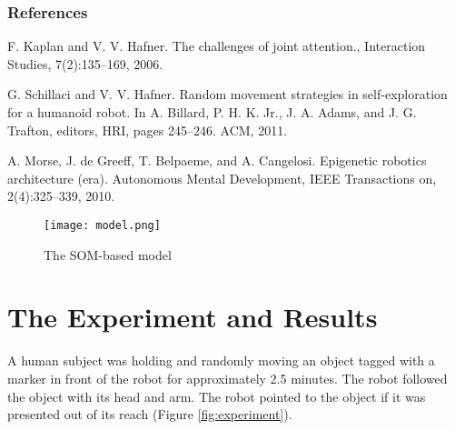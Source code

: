 \documentclass[final]{beamer}
\begin{document}
\begin{frame}[t]
\begin{multicols}{2}
\subsubsection{References}

% 
\begin{thebibliography}{99}

 F. Kaplan and V. V. Hafner. The challenges of joint attention., Interaction Studies, 7(2):135–169, 2006.


 G. Schillaci and V. V. Hafner. Random movement strategies in self-exploration for a humanoid robot. In A. Billard, P. H. K. Jr., J. A. Adams, and J. G. Trafton, editors, HRI, pages 245–246. ACM, 2011.

 A. Morse, J. de Greeff, T. Belpaeme, and A. Cangelosi. Epigenetic robotics architecture (era).
Autonomous Mental Development, IEEE Transactions on, 2(4):325–339, 2010.

\end{thebibliography}



\newpage
\begin{figure}[h]
\centering
\texttt{[image: model.png]}
\caption{The SOM-based model}
\label{fig:model}
\end{figure}


% 

\vspace{-2.4cm}
\section{The Experiment and Results}
A human subject was holding and randomly moving an object tagged with a marker in front of the robot for approximately 2.5 minutes. The robot followed the object with its head and arm. The robot pointed to the object if it was presented out of its reach (Figure \ref{fig:experiment}). 


\end{multicols}
\end{frame}
\end{document}
